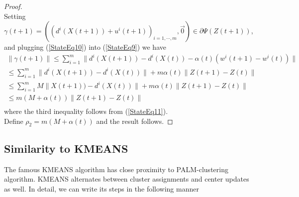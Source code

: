 \documentclass[11pt]{article}
\numberwithin{equation}{section}
\begin{document}
\begin{proof}
\begin{equation}
\end{equation}
Setting $\gamma(t+1) = \left( \left( d^i(X(t+1)) + u^i(t+1) \right)_{i=1, \cdots ,m}, \vec{0} \right) \in \partial \Psi(Z(t+1))$, and plugging (\ref{StateEq10}) into (\ref{StateEq9}) we have
\begin{equation*}
	\begin{split}
	\| \gamma(t+1) \|
	\leq \sum\limits_{i=1}^{m} \| d^i(X(t+1)) - d^i(X(t)) - \alpha(t) \left( w^i(t+1) - w^i(t) \right) \| \\
	\leq \sum\limits_{i=1}^{m} \| d^i(X(t+1)) - d^i(X(t)) \| + m \alpha(t) \|Z(t+1) - Z(t)\| \\
	\leq \sum\limits_{i=1}^{m} M \| X(t+1)) - d^i(X(t)) \| + m \alpha(t) \|Z(t+1) - Z(t)\| \\
	\leq m \left( M + \alpha(t) \right) \|Z(t+1) - Z(t)\| \\
	\end{split}
\end{equation*}
where the third inequality follows from (\ref{StateEq11}). \\
Define $\rho_2 = m \left( M + \alpha(t) \right)$ and the result follows.
\end{proof}

\subsection{Similarity to KMEANS}
The famous KMEANS algorithm has close proximity to PALM-clustering algorithm. KMEANS alternates between cluster assignments and center updates as well. In detail, we can write its steps in the following manner
\end{document}
